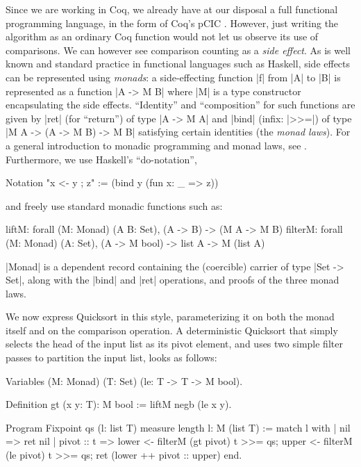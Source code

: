 \documentclass[runningheads]{llncs}
\begin{document}
Since we are working in Coq, we already have at our disposal a full functional
programming language, in the form of Coq's pCIC \cite{coq'art}. However, just
writing the algorithm as an ordinary Coq function would not let us observe its
use of comparisons. 
We can however see comparison counting as a \emph{side effect}. As is well
known and standard practice in functional languages such as Haskell, side
effects can be represented using \emph{monads}: a side-effecting function |f|
from |A| to |B| is represented as a function |A -> M B| where |M| is a type
constructor encapsulating the side effects. ``Identity'' and ``composition''
for such functions are given by |ret| (for ``return'') of type |A -> M A| and
|bind| (infix: |>>=|) of type |M A -> (A -> M B) -> M B| satisfying certain
identities (the \emph{monad laws}). For a general introduction to monadic
programming and monad laws, see \cite{wadler93monads}. Furthermore, we use
Haskell's ``do-notation'',
\begin{code}
 Notation "x <- y ; z" := (bind y (fun x: _ => z)) 
\end{code}
and freely use standard monadic functions such as:
\begin{code}
 liftM: forall (M: Monad) (A B: Set), (A -> B) -> (M A -> M B)
 filterM: forall (M: Monad) (A: Set), (A -> M bool) -> list A -> M (list A)
\end{code}
|Monad| is a dependent record containing the (coercible) carrier of type |Set
-> Set|, along with the |bind| and |ret| operations, and proofs of the three monad laws. 

We now express Quicksort in this style, parameterizing it on both the monad
itself and on the comparison operation. A deterministic Quicksort that simply selects the head of the input list as its pivot element, and uses two simple filter passes to partition the input list, looks as follows:

\begin{code}
  Variables (M: Monad) (T: Set) (le: T -> T -> M bool).

  Definition gt (x y: T): M bool := liftM negb (le x y).

  Program Fixpoint qs (l: list T) {measure length l}: M (list T) :=
    match l with
    | nil => ret nil
    | pivot :: t =>
        lower <- filterM (gt pivot) t >>= qs;
        upper <- filterM (le pivot) t >>= qs;
        ret (lower ++ pivot :: upper)
    end.
\end{code}
\end{document}
